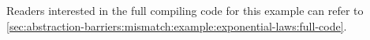 Readers interested in the full compiling code for this example can refer to \autoref{sec:abstraction-barriers:mismatch:example:exponential-laws:full-code}.


%

\begin{comment}
\begin{verbatim}
Require Import Coq.Arith.Arith.
Require Import Coq.Program.Basics.
Require Import Coq.micromega.Lia.
Require Import Coq.Lists.List.
Require Import Coq.Logic.Eqdep_dec.
Import ListNotations.
Local Open Scope list_scope.
Declare Scope vector_scope.
Delimit Scope vector_scope with vector.
Local Open Scope vector_scope.
Local Set Primitive Projections.
Set Implicit Arguments.
Import EqNotations.


\end{comment}

